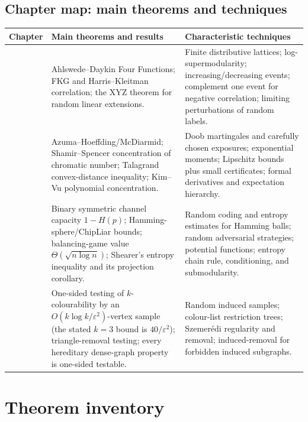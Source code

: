 \documentclass[10pt]{article}
\newcommand{\1}{\mathbf 1}
\begin{document}
\subsection*{Chapter map: main theorems and techniques}
\begingroup
\scriptsize
\setlength{\tabcolsep}{3.5pt}
\renewcommand{\arraystretch}{1.08}
\begin{center}
\begin{tabularx}{\textwidth}{@{}>{\raggedright\arraybackslash}p{}>{\raggedright\arraybackslash}X>{\raggedright\arraybackslash}X@{}}
\toprule
\textbf{Chapter} & \textbf{Main theorems and results} &
\textbf{Characteristic techniques}\\
\midrule
6 & Ahlswede--Daykin Four Functions; FKG and Harris--Kleitman correlation;
the XYZ theorem for random linear extensions. & Finite distributive lattices;
log-supermodularity; increasing/decreasing events; complement one event for negative
correlation; limiting perturbations of random labels.\\
7 & Azuma--Hoeffding/McDiarmid; Shamir--Spencer concentration of chromatic
number; Talagrand convex-distance inequality; Kim--Vu polynomial concentration.
& Doob martingales and carefully chosen exposures; exponential moments;
Lipschitz bounds plus small certificates; formal derivatives and expectation hierarchy.\\
15 & Binary symmetric channel capacity $1-H(p)$; Hamming-sphere/ChipLiar bounds;
balancing-game value $\Theta(\sqrt{n\log n})$; Shearer's entropy inequality and its
projection corollary. & Random coding and entropy estimates for Hamming balls;
random adversarial strategies; potential functions; entropy chain rule, conditioning,
and submodularity.\\
17 & One-sided testing of $k$-colourability by an
$O(k\log k/\varepsilon^2)$-vertex sample (the stated $k=3$ bound is
$40/\varepsilon^2$); triangle-removal testing; every hereditary dense-graph property
is one-sided testable. & Random induced samples; colour-list restriction trees;
Szemer\'edi regularity and removal; induced-removal for forbidden induced subgraphs.\\
\bottomrule
\end{tabularx}
\end{center}
\endgroup

\section*{Theorem inventory}
\begingroup
\small
\end{document}
